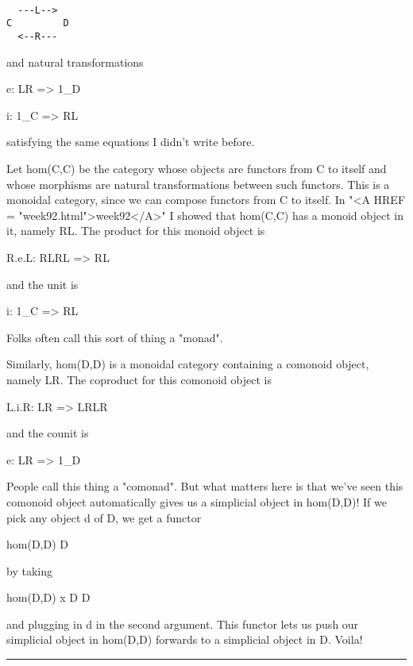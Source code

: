 \begin{verbatim}

  ---L-->
C         D
  <--R---
\end{verbatim}
    
and natural transformations

e: LR => 1_{D}

i: 1_{C} => RL

satisfying the same equations I didn't write before.  

Let hom(C,C) be the category whose objects are functors from C to
itself and whose morphisms are natural transformations between such
functors.  This is a monoidal category, since we can compose functors
from C to itself.  In "<A HREF = "week92.html">week92</A>" I showed that hom(C,C) has a monoid
object in it, namely RL.  The product for this monoid object is

R.e.L: RLRL => RL

and the unit is

i: 1_{C} => RL

Folks often call this sort of thing a "monad".  

Similarly, hom(D,D) is a monoidal category containing a comonoid object,
namely LR.  The coproduct for this comonoid object is

L.i.R: LR => LRLR

and the counit is

e: LR => 1_{D}

People call this thing a "comonad".  But what matters here is that we've
seen this comonoid object automatically gives us a simplicial object in
hom(D,D)!  If we pick any object d of D, we get a functor

hom(D,D) \to  D

by taking 

hom(D,D) x D \to  D

and plugging in d in the second argument.  This functor lets us push our
simplicial object in hom(D,D) forwards to a simplicial object in D.
Voila!













 \par\noindent\rule{\textwidth}{0.4pt}

